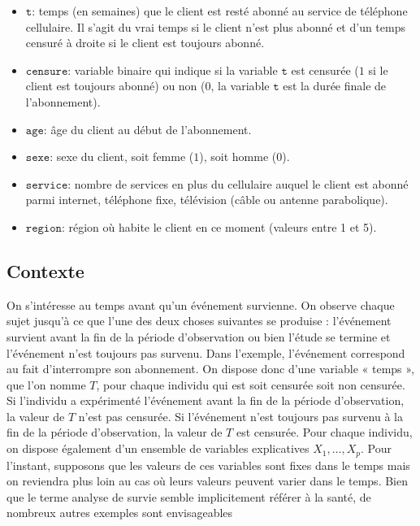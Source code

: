 \documentclass[
  11pt,
  letterpaper,
]{book}
\providecommand{\tightlist}{%
  \setlength{\itemsep}{0pt}\setlength{\parskip}{0pt}}
\theoremstyle{definition}
\theoremstyle{definition}
\theoremstyle{definition}
\theoremstyle{definition}
\theoremstyle{remark}
\begin{document}
\begin{itemize}
\tightlist
\item
  \(\texttt{t}\): temps (en semaines) que le client est resté abonné au service de téléphone cellulaire. Il s'agit du vrai temps si le client n'est plus abonné et d'un temps censuré à droite si le client est toujours abonné.
\item
  \(\texttt{censure}\): variable binaire qui indique si la variable \(\texttt{t}\) est censurée (\(1\) si le client est toujours abonné) ou non (\(0\), la variable \(\texttt{t}\) est la durée finale de l'abonnement).
\item
  \(\texttt{age}\): âge du client au début de l'abonnement.
\item
  \(\texttt{sexe}\): sexe du client, soit femme (\(1\)), soit homme (\(0\)).
\item
  \(\texttt{service}\): nombre de services en plus du cellulaire auquel le client est abonné parmi internet, téléphone fixe, télévision (câble ou antenne parabolique).
\item
  \(\texttt{region}\): région où habite le client en ce moment (valeurs entre 1 et 5).
\end{itemize}

\hypertarget{contexte}{%
\subsection{Contexte}\label{contexte}}

On s'intéresse au temps avant qu'un événement survienne. On observe chaque sujet jusqu'à ce que l'une des deux choses suivantes se produise : l'événement survient avant la fin de la période d'observation ou bien l'étude se termine et l'événement n'est toujours pas survenu. Dans l'exemple, l'événement correspond au fait d'interrompre son abonnement. On dispose donc d'une variable « temps », que l'on nomme \(T\), pour chaque individu qui est soit censurée soit non censurée. Si l'individu a expérimenté l'événement avant la fin de la période d'observation, la valeur de \(T\) n'est pas censurée. Si l'événement n'est toujours pas survenu à la fin de la période d'observation, la valeur de \(T\) est censurée. Pour chaque individu, on dispose également d'un ensemble de variables explicatives \(X_1, \ldots, X_p\). Pour l'instant, supposons que les valeurs de ces variables sont fixes dans le temps mais on reviendra plus loin au cas où leurs valeurs peuvent varier dans le temps. Bien que le terme analyse de survie semble implicitement référer à la santé, de nombreux autres exemples sont envisageables
\end{document}
